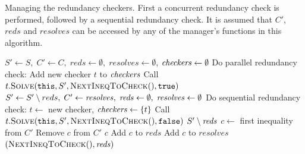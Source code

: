 \begin{algorithm}[htbp]
\caption{Managing the redundancy checkers. First a concurrent redundancy check is performed, followed by a sequential redundancy check. It is assumed that $C'$, $\mathit{reds}$ and $\mathit{resolves}$ can be accessed by any of the manager's functions in this algorithm.}\label{alg:manager}
\begin{algorithmic}[1]
	\State $S'\gets S,\; C'\gets C,\; \mathit{reds} \gets \emptyset,\; \mathit{resolves} \gets \emptyset$, $\mathit{checkers} \gets \emptyset$ 		
\State Do parallel redundancy check:
\Indent
		\State Add new checker $t$ to $\mathit{checkers}$
		\State Call $t.\Call{Solve}{\texttt{this}, S', \textsc{NextIneqToCheck}(), \true}$ 
\EndIndent
\Statex
\State $S'\gets S'\setminus reds,\; C'\gets \mathit{resolves},\; \mathit{reds} \gets \emptyset,\; \mathit{resolves} \gets \emptyset$
\State Do sequential redundancy check:
\Indent
		\State $t\gets $ new checker, $\mathit{checkers} \gets \{t\}$ 		
		\State Call $t.\Call{Solve}{\texttt{this}, S', \textsc{NextIneqToCheck}(), \false}$		
	\EndIf
\EndIndent
\State \Return $S'\setminus \mathit{reds}$ 
\EndFunction
\Statex
{}
			\State\Return \nul
		\Else
			\State $c \gets$ first inequality from $C'$
			\State Remove $c$ from $C'$
			\State \Return $c$
		\EndIf
\EndFunction
\Statex
{}\label{line:manageResult}
		\State Add $c$ to $\mathit{reds}$
			\State Add $c$ to $\mathit{resolves}$ 
	\EndIf
	\State \Return $(\Call{NextIneqToCheck}{\null}, \mi{reds})$
\EndFunction
\end{algorithmic}		
\end{algorithm}
%
